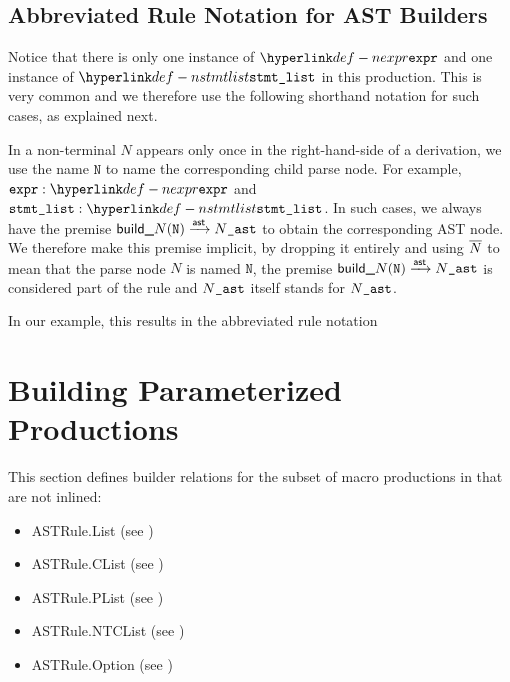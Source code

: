 \subsection{Abbreviated Rule Notation for AST Builders}
Notice that there is only one instance of $\Nexpr$ and one instance of $\Nstmtlist$ in this production.
This is very common and we therefore use the following shorthand notation for such cases, as explained next.

In a non-terminal $N$ appears only once in the right-hand-side of a derivation,
we use the name $\texttt{N}$ to name the corresponding child parse node.
For example, $\namednode{\vexpr}{\Nexpr}$ and $\namednode{\vstmtlist}{\Nstmtlist}$.
In such cases, we always have the premise $\textsf{build\_}N(\texttt{N}) \astarrow \astversion{N}$
to obtain the corresponding AST node.
We therefore make this premise implicit, by dropping it entirely and using $\astof{N}$ to mean that
the parse node $N$ is named $\texttt{N}$, the premise $\textsf{build\_}N(\texttt{N}) \astarrow \astversion{N}$
is considered part of the rule and $\astversion{N}$ itself stands for $\astversion{N}$.

In our example, this results in the abbreviated rule notation
\begin{mathpar}
\end{mathpar}

\section{Building Parameterized Productions\label{sec:BuildingParameterizedProductions}}
This section defines builder relations for the
subset of macro productions in 
that are not inlined:
\begin{itemize}
  \item ASTRule.List (see )
  \item ASTRule.CList (see )
  \item ASTRule.PList (see )
  \item ASTRule.NTCList (see )
  \item ASTRule.Option (see )
\end{itemize}

